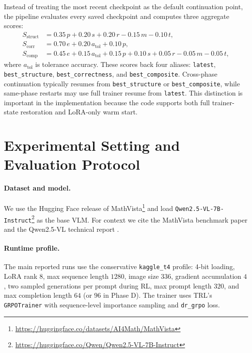 \documentclass{article} %
\begin{document}
Instead of treating the most recent checkpoint as the default continuation point, the pipeline evaluates every saved checkpoint and computes three aggregate scores:
\begin{align}
S_{\text{struct}} &= 0.35\,p + 0.20\,s + 0.20\,r - 0.15\,m - 0.10\,t, \\
S_{\text{corr}} &= 0.70\,e + 0.20\,a_{\text{tol}} + 0.10\,p, \\
S_{\text{comp}} &= 0.45\,e + 0.15\,a_{\text{tol}} + 0.15\,p + 0.10\,s + 0.05\,r - 0.05\,m - 0.05\,t,
\end{align}
where $a_{\text{tol}}$ is tolerance accuracy. These scores back four aliases: \texttt{latest}, \texttt{best\_structure}, \texttt{best\_correctness}, and \texttt{best\_composite}. Cross-phase continuation typically resumes from \texttt{best\_structure} or \texttt{best\_composite}, while same-phase restarts may use full trainer resume from \texttt{latest}. This distinction is important in the implementation because the code supports both full trainer-state restoration and LoRA-only warm start.

\section{Experimental Setting and Evaluation Protocol}

\paragraph{Dataset and model.}
We use the Hugging Face release of MathVista\footnote{\url{https://huggingface.co/datasets/AI4Math/MathVista}} and load \texttt{Qwen2.5-VL-7B-Instruct}\footnote{\url{https://huggingface.co/Qwen/Qwen2.5-VL-7B-Instruct}} as the base VLM. For context we cite the MathVista benchmark paper \citep{lu2024mathvista} and the Qwen2.5-VL technical report \citep{bai2025qwen25vl}.

\paragraph{Runtime profile.}
The main reported runs use the conservative \texttt{kaggle\_t4} profile: 4-bit loading, LoRA rank $8$, max sequence length $1280$, image size $336$, gradient accumulation $4$, two sampled generations per prompt during RL, max prompt length $320$, and max completion length $64$ (or $96$ in Phase D). The trainer uses TRL's \texttt{GRPOTrainer} with sequence-level importance sampling and \texttt{dr\_grpo} loss.
\end{document}
